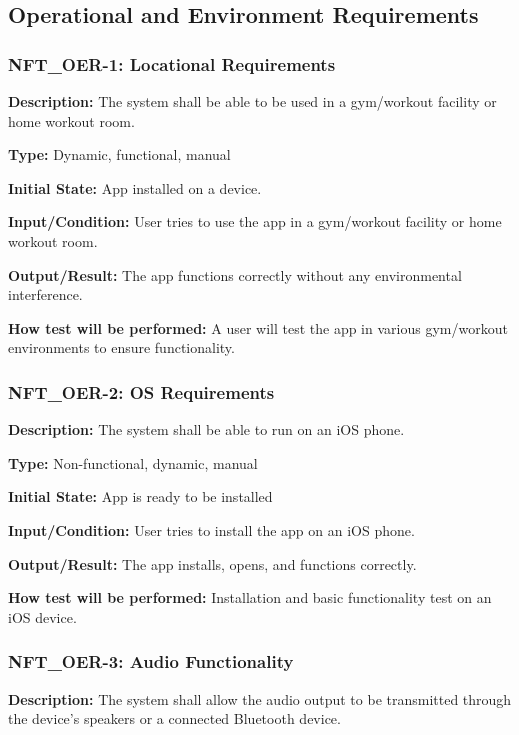 \documentclass[12pt, titlepage]{article}
\begin{document}
\subsection{Operational and Environment Requirements}


\subsubsection*{\textbf{NFT\_OER-1: Locational Requirements}
}

\textbf{Description: }The system shall be able to be used in a gym/workout facility or home workout room. 

\textbf{Type: }Dynamic, functional, manual

\textbf{Initial State: }App installed on a device.

\textbf{Input/Condition:} User tries to use the app in a gym/workout facility or home workout room.

\textbf{Output/Result:} The app functions correctly without any environmental interference.

\textbf{How test will be performed:} A user will test the app in various gym/workout environments to ensure functionality.


\subsubsection*{\textbf{NFT\_OER-2: OS Requirements}
}

\textbf{Description: }The system shall be able to run on an iOS phone.

\textbf{Type:} Non-functional, dynamic, manual

\textbf{Initial State:} App is ready to be installed

\textbf{Input/Condition:} User tries to install the app on an iOS phone.

\textbf{Output/Result:} The app installs, opens, and functions correctly.

\textbf{How test will be performed:} Installation and basic functionality test on an iOS device.


\subsubsection*{\textbf{NFT\_OER-3: Audio Functionality }
}

\textbf{Description: }The system shall allow the audio output to be transmitted through the device’s speakers or a connected Bluetooth device.
\end{document}
